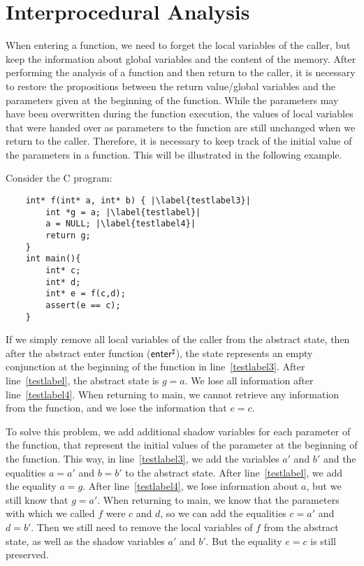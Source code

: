 \section{Interprocedural Analysis}

When entering a function, we need to forget the local variables of the caller, but keep the information about
global variables and the content of the memory.
After performing the analysis of a function and then return to the caller,
it is necessary to restore the propositions between the return value/global variables and
the parameters given at the beginning of the function.
While the parameters may have been overwritten during the function execution,
the values of local variables that were handed over as parameters to the
function are still unchanged when we return to the caller.
Therefore, it is necessary to keep track of the initial value of the parameters in a function.
This will be illustrated in the following example.

\begin{example}
    Consider the C program:

\begin{verbatim}
    int* f(int* a, int* b) { |\label{testlabel3}|
        int *g = a; |\label{testlabel}|
        a = NULL; |\label{testlabel4}|
        return g;
    }
    int main(){
        int* c;
        int* d;
        int* e = f(c,d);
        assert(e == c);
    }
\end{verbatim}


If we simply remove all local variables of the caller from the abstract state, then
after the abstract enter function ($\textsf{enter}^\sharp$), the state represents an empty conjunction
at the beginning of the function in line~\ref{testlabel3}.
After line~\ref{testlabel}, the abstract state is $g = a$.
We lose all information after line~\ref{testlabel4}.
When returning to \textsf{main}, we cannot retrieve any information from the function,
and we lose the information that $e = c$.

To solve this problem, we add additional shadow variables for each parameter of the function,
that represent the initial values of the parameter at the beginning of the function.
This way, in line~\ref{testlabel3}, we add the variables $a'$ and $b'$ and the equalities $a = a'$ and $b = b'$
to the abstract state.
After line~\ref{testlabel}, we add the equality $a = g$.
After line~\ref{testlabel4}, we lose information about $a$, but we still know that $g = a'$.
When returning to \textsf{main},
we know that the parameters with which we called $f$ were $c$ and $d$,
so we can add the equalities $c = a'$ and $d = b'$.
Then we still need to remove the local variables of $f$ from the abstract state,
as well as the shadow variables $a'$ and $b'$.
But the  equality $e = c$ is still preserved.
\end{example}

